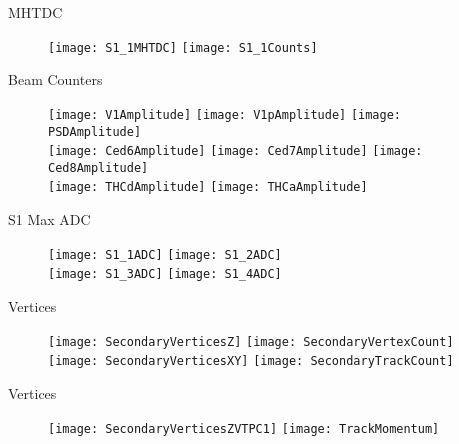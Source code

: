 \documentclass[11pt]{beamer}
\begin{document}
\begin{frame}{MHTDC}
\begin{figure}
\centering
\texttt{[image: S1\_1MHTDC]} 
\texttt{[image: S1\_1Counts]} 
\end{figure}
\end{frame}

\begin{frame}{Beam Counters}
\begin{figure}
\centering
\texttt{[image: V1Amplitude]} 
\texttt{[image: V1pAmplitude]}
\texttt{[image: PSDAmplitude]} \\
\texttt{[image: Ced6Amplitude]}
\texttt{[image: Ced7Amplitude]} 
\texttt{[image: Ced8Amplitude]} \\
\texttt{[image: THCdAmplitude]} 
\texttt{[image: THCaAmplitude]} 
\end{figure}
\end{frame}

\begin{frame}{S1 Max ADC}
\begin{figure}
\centering
\texttt{[image: S1\_1ADC]}
\texttt{[image: S1\_2ADC]} \\
\texttt{[image: S1\_3ADC]}
\texttt{[image: S1\_4ADC]}
\end{figure}
\end{frame}

\begin{frame}{Vertices}
\begin{figure}
\centering
\texttt{[image: SecondaryVerticesZ]}
\texttt{[image: SecondaryVertexCount]} \\
\texttt{[image: SecondaryVerticesXY]}
\texttt{[image: SecondaryTrackCount]} \\
\end{figure}
\end{frame}

\begin{frame}{Vertices}
\begin{figure}
\centering
\texttt{[image: SecondaryVerticesZVTPC1]}
\texttt{[image: TrackMomentum]}
\end{figure}
\end{frame}
\end{document}
